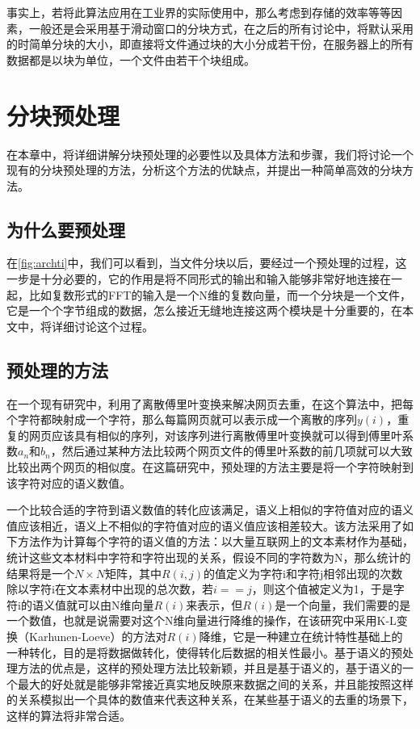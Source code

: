 事实上，若将此算法应用在工业界的实际使用中，那么考虑到存储的效率等等因素，一般还是会采用基于滑动窗口的分块方式，在之后的所有讨论中，将默认采用的时简单分块的大小，即直接将文件通过块的大小分成若干份，在服务器上的所有数据都是以块为单位，一个文件由若干个块组成。

\section{分块预处理}
\label{sec:proproc}

在本章中，将详细讲解分块预处理的必要性以及具体方法和步骤，我们将讨论一个现有的分块预处理的方法，分析这个方法的优缺点，并提出一种简单高效的分块方法。

\subsection{为什么要预处理}
\label{sec:why}

在\ref{fig:archti}中，我们可以看到，当文件分块以后，要经过一个预处理的过程，这一步是十分必要的，它的作用是将不同形式的输出和输入能够非常好地连接在一起，比如复数形式的FFT的输入是一个N维的复数向量，而一个分块是一个文件，它是一个个字节组成的数据，怎么接近无缝地连接这两个模块是十分重要的，在本文中，将详细讨论这个过程。

\subsection{预处理的方法}
\label{sec:appro}

在一个现有研究中，利用了离散傅里叶变换来解决网页去重，在这个算法中，把每个字符都映射成一个字符，那么每篇网页就可以表示成一个离散的序列$y(i)$，重复的网页应该具有相似的序列，对该序列进行离散傅里叶变换就可以得到傅里叶系数$a_n$和$b_n$，然后通过某种方法比较两个网页文件的傅里叶系数的前几项就可以大致比较出两个网页的相似度。在这篇研究中，预处理的方法主要是将一个字符映射到该字符对应的语义数值。

一个比较合适的字符到语义数值的转化应该满足，语义上相似的字符值对应的语义值应该相近，语义上不相似的字符值对应的语义值应该相差较大。该方法采用了如下方法作为计算每个字符的语义值的方法：以大量互联网上的文本素材作为基础，统计这些文本材料中字符和字符出现的关系，假设不同的字符数为N，那么统计的结果将是一个$N \times N$矩阵，其中$R(i, j)$的值定义为字符i和字符j相邻出现的次数除以字符i在文本素材中出现的总次数，若$i==j$，则这个值被定义为1，于是字符i的语义值就可以由N维向量$R(i)$来表示，但$R(i)$是一个向量，我们需要的是一个数值，也就是说需要对这个N维向量进行降维的操作，在该研究中采用K-L变换（Karhunen-Loeve）的方法对$R(i)$降维，它是一种建立在统计特性基础上的一种转化，目的是将数据做转化，使得转化后数据的相关性最小。基于语义的预处理方法的优点是，这样的预处理方法比较新颖，并且是基于语义的，基于语义的一个最大的好处就是能够非常接近真实地反映原来数据之间的关系，并且能按照这样的关系模拟出一个具体的数值来代表这种关系，在某些基于语义的去重的场景下，这样的算法将非常合适。

